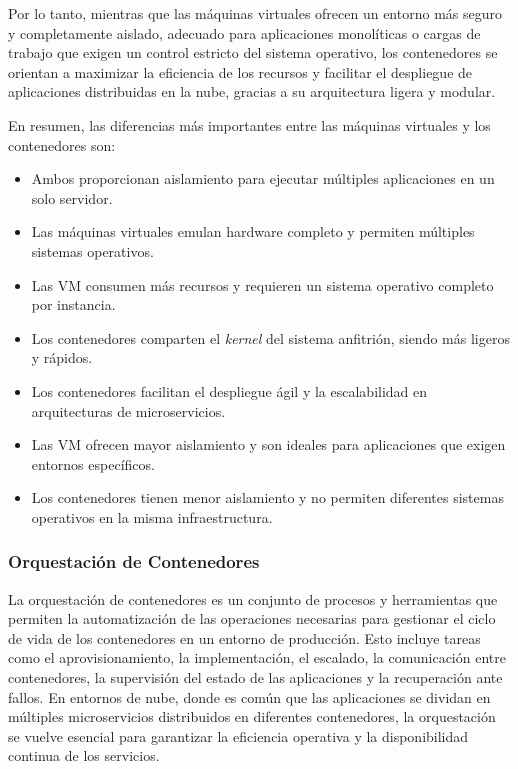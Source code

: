 {                Por lo tanto, mientras que las máquinas virtuales ofrecen un entorno más seguro y completamente aislado, adecuado para aplicaciones monolíticas o cargas de trabajo que exigen un control estricto del sistema operativo, los contenedores se orientan a maximizar la eficiencia de los recursos y facilitar el despliegue de aplicaciones distribuidas en la nube, gracias a su arquitectura ligera y modular.
    
                En resumen, las diferencias más importantes entre las máquinas virtuales y los contenedores son:
    
                \begin{itemize}
                    \item Ambos proporcionan aislamiento para ejecutar múltiples aplicaciones en un solo servidor.
                    \item Las máquinas virtuales emulan hardware completo y permiten múltiples sistemas operativos.
                    \item Las VM consumen más recursos y requieren un sistema operativo completo por instancia.
                    \item Los contenedores comparten el \textit{kernel} del sistema anfitrión, siendo más ligeros y rápidos.
                    \item Los contenedores facilitan el despliegue ágil y la escalabilidad en arquitecturas de microservicios.
                    \item Las VM ofrecen mayor aislamiento y son ideales para aplicaciones que exigen entornos específicos.
                    \item Los contenedores tienen menor aislamiento y no permiten diferentes sistemas operativos en la misma infraestructura.
                \end{itemize}
                
            \subsubsection{Orquestación de Contenedores}
                La orquestación de contenedores es un conjunto de procesos y herramientas que permiten la automatización de las operaciones necesarias para gestionar el ciclo de vida de los contenedores en un entorno de producción. Esto incluye tareas como el aprovisionamiento, la implementación, el escalado, la comunicación entre contenedores, la supervisión del estado de las aplicaciones y la recuperación ante fallos. En entornos de nube, donde es común que las aplicaciones se dividan en múltiples microservicios distribuidos en diferentes contenedores, la orquestación se vuelve esencial para garantizar la eficiencia operativa y la disponibilidad continua de los servicios.
                
}
